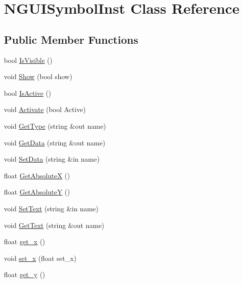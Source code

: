 \hypertarget{class_n_g_u_i_symbol_inst}{}\section{N\+G\+U\+I\+Symbol\+Inst Class Reference}
\label{class_n_g_u_i_symbol_inst}
\subsection*{Public Member Functions}
\begin{DoxyCompactItemize}
\item 
bool \hyperlink{class_n_g_u_i_symbol_inst_a7f5e5472748640985037ba5b8db08ea9}{Is\+Visible} ()
\item 
void \hyperlink{class_n_g_u_i_symbol_inst_a46bdaa7278a761678465e3c237b078fe}{Show} (bool show)
\item 
bool \hyperlink{class_n_g_u_i_symbol_inst_af99bcee9710a5379faefa4fb55117020}{Is\+Active} ()
\item 
void \hyperlink{class_n_g_u_i_symbol_inst_ac35fe91439da9e92e63ab0fd7a760f50}{Activate} (bool Active)
\item 
void \hyperlink{class_n_g_u_i_symbol_inst_a7bc04fdbdca9986d8561eac22d99ebd4}{Get\+Type} (string \&out name)
\item 
void \hyperlink{class_n_g_u_i_symbol_inst_aa64815f101c03ccbd84af636149fce5d}{Get\+Data} (string \&out name)
\item 
void \hyperlink{class_n_g_u_i_symbol_inst_a6285b27500e3f532a6466f8af95af050}{Set\+Data} (string \&in name)
\item 
float \hyperlink{class_n_g_u_i_symbol_inst_a30b841d2e266152cec974f707e3cd64e}{Get\+AbsoluteX} ()
\item 
float \hyperlink{class_n_g_u_i_symbol_inst_aec00e28d203883db079ef1e57b87715f}{Get\+AbsoluteY} ()
\item 
void \hyperlink{class_n_g_u_i_symbol_inst_a7f2156350aab4ccf80ce0e8939704164}{Set\+Text} (string \&in name)
\item 
void \hyperlink{class_n_g_u_i_symbol_inst_af07351f2f8fc813cdfe400d94c265dde}{Get\+Text} (string \&out name)
\item 
float \hyperlink{class_n_g_u_i_symbol_inst_a87825fddf6c5bbc15aef8feb6f031c71}{get\+\_\+x} ()
\item 
void \hyperlink{class_n_g_u_i_symbol_inst_a326f6e238bd4a84f7192f422b8cae087}{set\+\_\+x} (float set\+\_\+x)
\item 
float \hyperlink{class_n_g_u_i_symbol_inst_a1949207136dd7dcff46d03bca3d2a3c3}{get\+\_\+y} ()

\end{DoxyCompactItemize}
